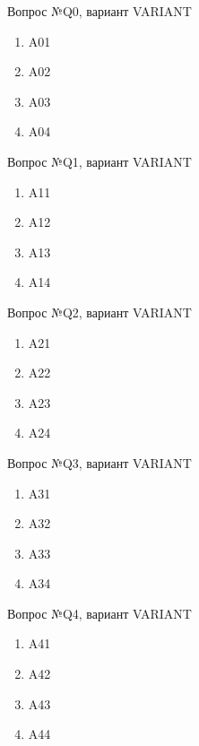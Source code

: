 \documentclass[a4paper,5pt]{article}
\begin{document}
	
	\begin{center}
		Вопрос №Q0, вариант VARIANT
	\end{center}
	\newline
	\begin{enumerate}
		\item A01
		\item A02
		\item A03
		\item A04
	\end{enumerate}

	\begin{center}
		Вопрос №Q1, вариант VARIANT
	\end{center}
	\newline
	\begin{enumerate}
		\item A11
		\item A12
		\item A13
		\item A14
	\end{enumerate}
	
	\begin{center}
		Вопрос №Q2, вариант VARIANT
	\end{center}
	\newline
	\begin{enumerate}
		\item A21
		\item A22
		\item A23
		\item A24
	\end{enumerate}
	
	\begin{center}
		Вопрос №Q3, вариант VARIANT
	\end{center}
	\newline
	\begin{enumerate}
		\item A31
		\item A32
		\item A33
		\item A34
	\end{enumerate}
	
	\begin{center}
		Вопрос №Q4, вариант VARIANT
	\end{center}
	\newline
	\begin{enumerate}
		\item A41
		\item A42
		\item A43
		\item A44
	\end{enumerate}
	
\end{document}
